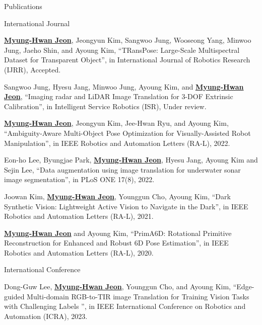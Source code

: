 \begin{rSection}{Publications}



\begin{pubSubsection}{International Journal}

  \item \underline{\textbf{Myung-Hwan Jeon}}, Jeongyun Kim, Sangwoo Jung, Wooseong Yang, Minwoo Jung, Jaeho Shin, and Ayoung Kim, “TRansPose: Large-Scale Multispectral Dataset for Transparent Object”, in International Journal of Robotics Research (IJRR), Accepted.

  \item Sangwoo Jung, Hyesu Jang, Minwoo Jung, Ayoung Kim, and \underline{\textbf{Myung-Hwan Jeon}}, “Imaging radar and LiDAR Image Translation for 3-DOF Extrinsic Calibration”, in Intelligent Service Robotics (ISR), Under review.

  \item \underline{\textbf{Myung-Hwan Jeon}}, Jeongyun Kim, Jee-Hwan Ryu, and Ayoung Kim, “Ambiguity-Aware Multi-Object Pose Optimization for Visually-Assisted Robot Manipulation”, in IEEE Robotics and Automation Letters (RA-L), 2022.
  
  \item Eon-ho Lee, Byungjae Park, \underline{\textbf{Myung-Hwan Jeon}}, Hyesu Jang, Ayoung Kim and Sejin Lee, “Data augmentation using image translation for underwater sonar image segmentation”, in PLoS ONE 17(8), 2022.
  
  \item Joowan Kim, \underline{\textbf{Myung-Hwan Jeon}}, Younggun Cho, Ayoung Kim, “Dark Synthetic Vision: Lightweight Active Vision to Navigate in the Dark”, in IEEE Robotics and Automation Letters (RA-L), 2021.
  
  \item \underline{\textbf{Myung-Hwan Jeon}} and Ayoung Kim, “PrimA6D: Rotational Primitive Reconstruction for Enhanced and Robust 6D Pose Estimation”, in IEEE Robotics and Automation Letters (RA-L), 2020.  

\end{pubSubsection}

\begin{pubSubsection}{International Conference}


  \item Dong-Guw Lee, \underline{\textbf{Myung-Hwan Jeon}}, Younggun Cho, and Ayoung Kim, “Edge-guided Multi-domain RGB-to-TIR image Translation for Training Vision Tasks with Challenging Labels ”, in IEEE International Conference on Robotics and Automation (ICRA), 2023.


\end{pubSubsection}
\end{rSection}
